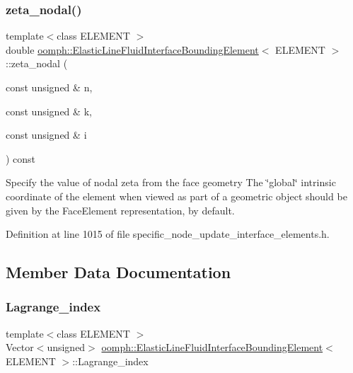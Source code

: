 \subsubsection{\texorpdfstring{zeta\+\_\+nodal()}{zeta\_nodal()}}
{\footnotesize\ttfamily template$<$class E\+L\+E\+M\+E\+NT $>$ \\
double \hyperlink{classoomph_1_1ElasticLineFluidInterfaceBoundingElement}{oomph\+::\+Elastic\+Line\+Fluid\+Interface\+Bounding\+Element}$<$ E\+L\+E\+M\+E\+NT $>$\+::zeta\+\_\+nodal (\begin{DoxyParamCaption}\item[{const unsigned \&}]{n,  }\item[{const unsigned \&}]{k,  }\item[{const unsigned \&}]{i }\end{DoxyParamCaption}) const\hspace{0.3cm}{\ttfamily [inline]}}



Specify the value of nodal zeta from the face geometry The \char`\"{}global\char`\"{} intrinsic coordinate of the element when viewed as part of a geometric object should be given by the Face\+Element representation, by default. 



Definition at line 1015 of file specific\+\_\+node\+\_\+update\+\_\+interface\+\_\+elements.\+h.



\subsection{Member Data Documentation}
\mbox{\label{classoomph_1_1ElasticLineFluidInterfaceBoundingElement_ab60624e63f1ef1b59d191a83b16eb1de}} 
\subsubsection{\texorpdfstring{Lagrange\+\_\+index}{Lagrange\_index}}
{\footnotesize\ttfamily template$<$class E\+L\+E\+M\+E\+NT $>$ \\
Vector$<$unsigned$>$ \hyperlink{classoomph_1_1ElasticLineFluidInterfaceBoundingElement}{oomph\+::\+Elastic\+Line\+Fluid\+Interface\+Bounding\+Element}$<$ E\+L\+E\+M\+E\+NT $>$\+::Lagrange\+\_\+index\hspace{0.3cm}{\ttfamily [private]}}



